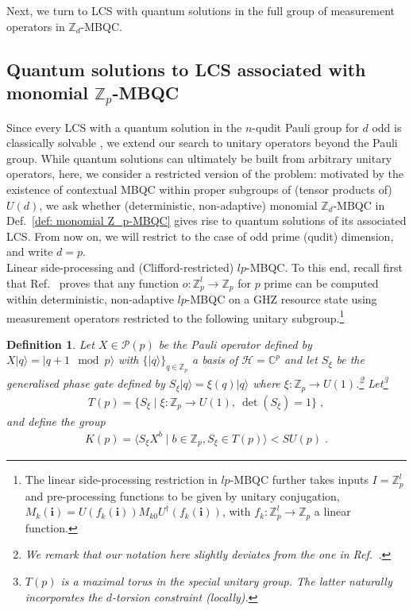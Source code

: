 \documentclass[aps,pra,letterpaper,onrcolumn,nofootinbib,notitlepage,longbibliography]{revtex4-1}
\newtheorem{definition}{Definition}
\newcommand{\ra}{\ensuremath{\rightarrow}}
\newcommand{\zz}{\mathbb Z}
\newcommand{\C}{\mathbb C}
\newcommand{\Z}{\mathbb Z}
\newcommand{\bi}{\mathbf{i}}
\newcommand\mc[1]{\mathcal{#1}}
\newcommand{\cH}{\mc{H}}
\newcommand{\cP}{\mc{P}}
\begin{document}
Next, we turn to LCS with quantum solutions in the full group of measurement operators in $\zz_d$-MBQC.



\subsection{Quantum solutions to LCS associated with monomial $\zz_p$-MBQC}

Since every LCS with a quantum solution in the $n$-qudit Pauli group for $d$ odd is classically solvable \cite{QassimWallman2020}, we extend our search to unitary operators beyond the Pauli group. While quantum solutions can ultimately be built from arbitrary unitary operators, here, we consider a restricted version of the problem: motivated by the existence of contextual MBQC within proper subgroups of (tensor products of) $U(d)$, we ask whether (deterministic, non-adaptive) monomial $\zz_d$-MBQC in Def.~\ref{def: monomial Z_p-MBQC} gives rise to quantum solutions of its associated LCS. From now on, we will restrict to the case of odd prime (qudit) dimension, and write $d=p$.\\

Linear side-processing and (Clifford-restricted) $lp$-MBQC. To this end, recall first that Ref.~\cite{FrembsRobertsCampbellBartlett2022} proves that any function $o:\zz^l_p\ra\zz_p$ for $p$ prime can be computed within deterministic, non-adaptive $lp$-MBQC on a GHZ resource state using measurement operators restricted to the following unitary subgroup.\footnote{The linear side-processing restriction in $lp$-MBQC further takes inputs $I=\zz^l_p$ and pre-processing functions to be given by unitary conjugation, $M_k(\bi)=U(f_k(\bi))M_{k0}U^\dagger(f_k(\bi))$, with $f_k:\zz^l_p\ra\zz_p$ a linear function.\label{fn: lp-MBQC}} 

\begin{definition}\label{def: K-group}
    Let $X\in\cP(p)$ be the Pauli operator defined by $X|q\rangle=|q+1\mod p\rangle$ with $\{|q\rangle\}_{q\in\zz_p}$ a basis of $\cH=\C^p$ and let $S_\xi$ be the generalised phase gate defined by $S_\xi|q\rangle = \xi(q)|q\rangle$ where $\xi:\Z_p\to U(1)$.\footnote{We remark that our notation here slightly deviates from the one in Ref.~\cite{FrembsChungOkay2022}.\label{fn: xi convention}} Let\footnote{$T(p)$ is a maximal torus in the special unitary group. The latter naturally incorporates the $d$-torsion constraint (locally).}
    \begin{align*}
        T(p)
        =\{S_\xi\mid\xi:\zz_p\ra U(1),\ \det(S_\xi)=1\}\; ,
    \end{align*}
    and define the group
    \begin{align}\label{def: K-group}
        K(p)
        =\langle S_\xi X^b\mid b\in\zz_p, S_\xi\in T(p)\rangle<SU(p)\; .
    \end{align}
\end{definition}
\end{document}
